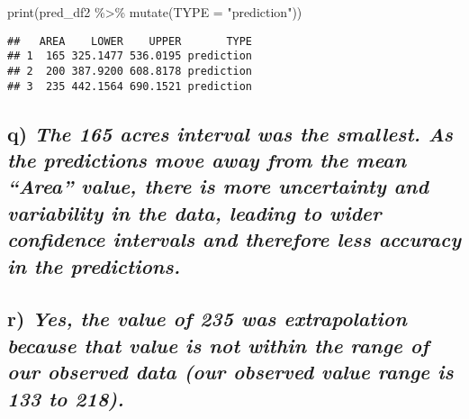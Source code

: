 \documentclass[
]{article}
\newenvironment{Shaded}{\begin{snugshade}}{\end{snugshade}}
\newcommand{\AttributeTok}[1]{\textcolor[rgb]{0.77,0.63,0.00}{#1}}
\newcommand{\FunctionTok}[1]{\textcolor[rgb]{0.00,0.00,0.00}{#1}}
\newcommand{\NormalTok}[1]{#1}
\newcommand{\SpecialCharTok}[1]{\textcolor[rgb]{0.00,0.00,0.00}{#1}}
\newcommand{\StringTok}[1]{\textcolor[rgb]{0.31,0.60,0.02}{#1}}
\begin{document}
\begin{Shaded}
\begin{Highlighting}[]
\FunctionTok{print}\NormalTok{(pred\_df2 }\SpecialCharTok{\%\textgreater{}\%} \FunctionTok{mutate}\NormalTok{(}\AttributeTok{TYPE =} \StringTok{"prediction"}\NormalTok{))}
\end{Highlighting}
\end{Shaded}

\begin{verbatim}
##   AREA    LOWER    UPPER       TYPE
## 1  165 325.1477 536.0195 prediction
## 2  200 387.9200 608.8178 prediction
## 3  235 442.1564 690.1521 prediction
\end{verbatim}

\hypertarget{q-the-165-acres-interval-was-the-smallest.-as-the-predictions-move-away-from-the-mean-area-value-there-is-more-uncertainty-and-variability-in-the-data-leading-to-wider-confidence-intervals-and-therefore-less-accuracy-in-the-predictions.}{%
\subsection{\texorpdfstring{q) \emph{The 165 acres interval was the
smallest. As the predictions move away from the mean ``Area'' value,
there is more uncertainty and variability in the data, leading to wider
confidence intervals and therefore less accuracy in the
predictions.}}{q) The 165 acres interval was the smallest. As the predictions move away from the mean ``Area'' value, there is more uncertainty and variability in the data, leading to wider confidence intervals and therefore less accuracy in the predictions.}}\label{q-the-165-acres-interval-was-the-smallest.-as-the-predictions-move-away-from-the-mean-area-value-there-is-more-uncertainty-and-variability-in-the-data-leading-to-wider-confidence-intervals-and-therefore-less-accuracy-in-the-predictions.}}

\hypertarget{r-yes-the-value-of-235-was-extrapolation-because-that-value-is-not-within-the-range-of-our-observed-data-our-observed-value-range-is-133-to-218.}{%
\subsection{\texorpdfstring{r) \emph{Yes, the value of 235 was
extrapolation because that value is not within the range of our observed
data (our observed value range is 133 to
218).}}{r) Yes, the value of 235 was extrapolation because that value is not within the range of our observed data (our observed value range is 133 to 218).}}\label{r-yes-the-value-of-235-was-extrapolation-because-that-value-is-not-within-the-range-of-our-observed-data-our-observed-value-range-is-133-to-218.}}
\end{document}
